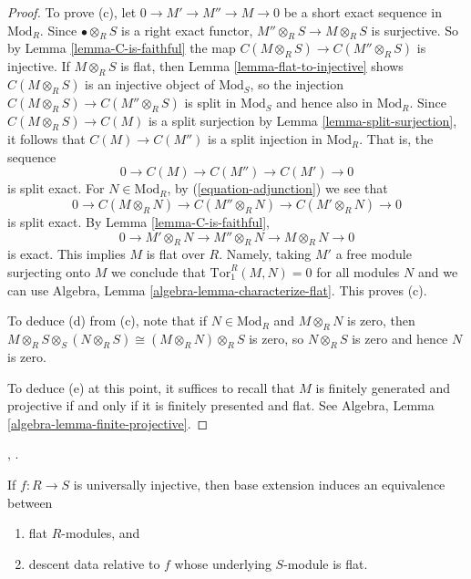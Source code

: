 \begin{proof}
\medskip\noindent
To prove (c), let $0 \to M' \to M'' \to M \to 0$ be a short exact sequence in 
$\text{Mod}_R$. Since $\bullet \otimes_R S$ is a right exact functor,
$M'' \otimes_R S \to M \otimes_R S$ is surjective. So by
Lemma \ref{lemma-C-is-faithful} the map
$C(M \otimes_R S) \to C(M'' \otimes_R S)$ is injective.
If $M \otimes_R S$ is flat, then
Lemma \ref{lemma-flat-to-injective} shows
$C(M \otimes_R S)$ is an injective object of $\text{Mod}_S$, so the injection
$C(M \otimes_R S) \to C(M'' \otimes_R S)$
is split in $\text{Mod}_S$ and hence also in $\text{Mod}_R$.
Since $C(M \otimes_R S) \to C(M)$ is a split surjection by 
Lemma \ref{lemma-split-surjection}, it follows that 
$C(M) \to C(M'')$ is a split injection in $\text{Mod}_R$. That is, the sequence
$$
0 \to C(M) \to C(M'') \to C(M') \to 0
$$
is split exact. 
For $N \in \text{Mod}_R$, by (\ref{equation-adjunction}) we see that 
$$
0 \to C(M \otimes_R N) \to C(M'' \otimes_R N) \to C(M' \otimes_R N) \to 0
$$
is split exact. By Lemma \ref{lemma-C-is-faithful}, 
$$
0 \to M' \otimes_R N \to M'' \otimes_R N \to M \otimes_R N \to 0
$$
is exact. This implies $M$ is flat over $R$. Namely, taking
$M'$ a free module surjecting onto $M$ we conclude that
$\text{Tor}_1^R(M, N) = 0$ for all modules $N$ and we can use
Algebra, Lemma \ref{algebra-lemma-characterize-flat}.
This proves (c).

\medskip\noindent
To deduce (d) from (c), note that if $N \in \text{Mod}_R$ and $M \otimes_R N$ 
is zero,
then $M \otimes_R S \otimes_S (N \otimes_R S) \cong (M \otimes_R N) \otimes_R 
S$ is zero,
so $N \otimes_R S$ is zero and hence $N$ is zero.

\medskip\noindent
To deduce (e) at this point, it suffices to recall that $M$ is finitely 
generated and projective if and only if it is finitely presented and flat.
See Algebra, Lemma \ref{algebra-lemma-finite-projective}.
\end{proof}

\begin{lemma}
\label{lemma-effective-descent-flat-modules}
\begin{reference}
\cite[Expos\'e 190, n\textsuperscript{o} 2(c), p. 307]{FGA},
\cite{mesablishvili2}.
\end{reference}
If $f : R \to S$ is universally injective, then base extension induces an
equivalence between
\begin{enumerate}
\item flat $R$-modules, and
\item descent data relative to $f$ whose underlying $S$-module is flat.
\end{enumerate}
\end{lemma}

